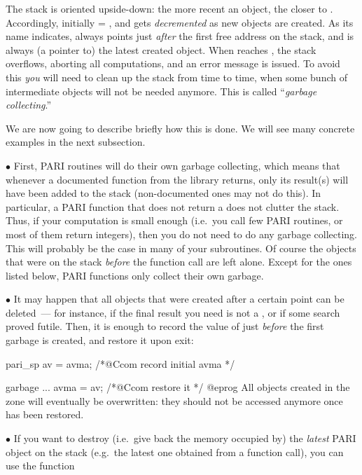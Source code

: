 The stack is oriented upside-down: the more recent an object, the closer to
. Accordingly, initially  = , and  gets
\emph{decremented} as new objects are created. As its name indicates,
 always points just \emph{after} the first free address on the
stack, and  is always (a pointer to) the latest created object.
When  reaches , the stack overflows, aborting all
computations, and an error message is issued. To avoid this \emph{you} will
need to clean up the stack from time to time, when some bunch of intermediate
objects will not be needed anymore. This is called ``\emph{garbage
collecting}.''

We are now going to describe briefly how this is done. We will see many
concrete examples in the next subsection.

\noindent$\bullet$
First, PARI routines will do their own garbage collecting, which
means that whenever a documented function from the library returns, only its
result(s) will have been added to the stack (non-documented ones may not do
this). In particular, a PARI function that does not return
a  does not clutter the stack. Thus, if your computation is small
enough (i.e.~you call few PARI routines, or most of them return 
integers), then you do not need to do any garbage collecting. This will probably
be the case in many of your subroutines. Of course the objects that were on
the stack \emph{before} the function call are left alone. Except for the ones
listed below, PARI functions only collect their own garbage.

\noindent$\bullet$
It may happen that all objects that were created after a certain point can
be deleted~--- for instance, if the final result you need is not a
, or if some search proved futile. Then, it is enough to record
the value of  just \emph{before} the first garbage is created,
and restore it upon exit:

\bprog
pari_sp av = avma; /*@Ccom record initial avma */

garbage ...
avma = av; /*@Ccom restore it */
@eprog
\noindent All objects created in the  zone will eventually
be overwritten: they should not be accessed anymore once  has been
restored.

\noindent$\bullet$
If you want to destroy (i.e.~give back the memory occupied by) the
\emph{latest} PARI object on the stack (e.g.~the latest one obtained from a
function call), you can use the function%

